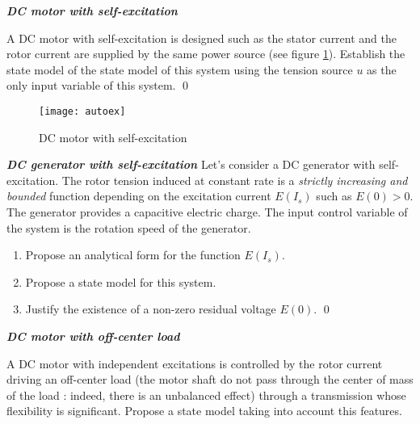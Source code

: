 \begin{exercice}{\bf \em DC motor with self-excitation}

A DC motor with self-excitation is designed such as the stator 
current and the rotor current are supplied by the same power source
(see figure \ref{fig:autoex}). Establish the state model of the state model 
of this system using the tension source $u$ as the only input 
variable of this system. \qed
\begin{figure}[htbp]
\begin{center}
\texttt{[image: autoex]}
\caption{DC motor with self-excitation}
\label{fig:autoex}
\end{center}
\end{figure}
\end{exercice}
\vv

\begin{exercice}{\bf \em DC generator with self-excitation}
Let's consider a DC generator with self-excitation. The rotor tension 
induced at constant rate is a {\em strictly  increasing and bounded} function 
depending on the excitation current $E(I_s)$ such as $E(0) >
0$. The generator provides a capacitive electric charge. 
The input control variable of the system is the rotation speed of 
the generator. 
\begin{enumerate}
\item Propose an analytical form for the function $E(I_s)$.
\item Propose a state model for this system.
\item Justify the existence of a non-zero residual voltage $E(0)$. \qed
\end{enumerate}
\end{exercice}
\vv

\begin{exercice}{\bf \em DC motor with off-center load}

A DC motor with independent excitations is controlled by the rotor current
driving an off-center load (the motor shaft do not pass through the 
center of mass of the load : indeed, there is an unbalanced effect)
through a transmission whose flexibility is significant. 
Propose a state model taking into account this features. 
\end{exercice}
\vv

